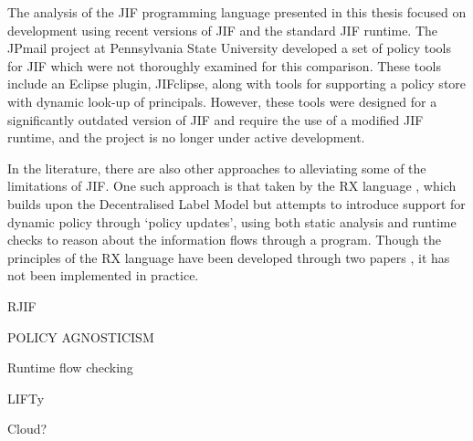 The analysis of the JIF programming language presented in this thesis focused on development using recent versions of JIF and the standard JIF runtime. The JPmail project \cite{jpmailpage} at Pennsylvania State University developed a set of policy tools for JIF which were not thoroughly examined for this comparison. These tools include an Eclipse plugin, JIFclipse, along with tools for supporting a policy store with dynamic look-up of principals. However, these tools were designed for a significantly outdated version of JIF and require the use of a modified JIF runtime, and the project is no longer under active development.

In the literature, there are also other approaches to alleviating some of the limitations of JIF. One such approach is that taken by the RX language \cite{swamy06rx}, which builds upon the Decentralised Label Model but attempts to introduce support for dynamic policy through `policy updates', using both static analysis and runtime checks to reason about the information flows through a program. Though the principles of the RX language have been developed through two papers \cite{hicks05rx} \cite{swamy06rx}, it has not been implemented in practice.

RJIF \cite{kozyri2016jrif}

POLICY AGNOSTICISM

Runtime flow checking

LIFTy \cite{polikarpova2016lifty}

Cloud?